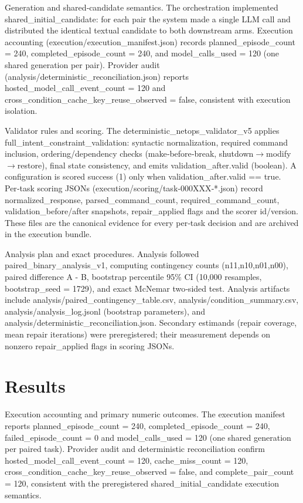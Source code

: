 \documentclass[conference]{IEEEtran}
\begin{document}
Generation and shared‑candidate semantics. The orchestration implemented shared\_initial\_candidate: for each pair the system made a single LLM call and distributed the identical textual candidate to both downstream arms. Execution accounting (execution/execution\_manifest.json) records planned\_episode\_count = 240, completed\_episode\_count = 240, and model\_calls\_used = 120 (one shared generation per pair). Provider audit (analysis/deterministic\_reconciliation.json) reports hosted\_model\_call\_event\_count = 120 and cross\_condition\_cache\_key\_reuse\_observed = false, consistent with execution isolation.

Validator rules and scoring. The deterministic\_netops\_validator\_v5 applies full\_intent\_constraint\_validation: syntactic normalization, required command inclusion, ordering/dependency checks (make‑before‑break, shutdown\ensuremath{\rightarrow}modify\ensuremath{\rightarrow}restore), final state consistency, and emits validation\_after.valid (boolean). A configuration is scored success (1) only when validation\_after.valid == true. Per‑task scoring JSONs (execution/scoring/task‑000XXX‑*.json) record normalized\_response, parsed\_command\_count, required\_command\_count, validation\_before/after snapshots, repair\_applied flags and the scorer id/version. These files are the canonical evidence for every per‑task decision and are archived in the execution bundle.

Analysis plan and exact procedures. Analysis followed paired\_binary\_analysis\_v1, computing contingency counts (n11,n10,n01,n00), paired difference A - B, bootstrap percentile 95\% CI (10,000 resamples, bootstrap\_seed = 1729), and exact McNemar two‑sided test. Analysis artifacts include analysis/paired\_contingency\_table.csv, analysis/condition\_summary.csv, analysis/analysis\_log.jsonl (bootstrap parameters), and analysis/deterministic\_reconciliation.json. Secondary estimands (repair coverage, mean repair iterations) were preregistered; their measurement depends on nonzero repair\_applied flags in scoring JSONs.

\section{Results}
Execution accounting and primary numeric outcomes. The execution manifest reports planned\_episode\_count = 240, completed\_episode\_count = 240, failed\_episode\_count = 0 and model\_calls\_used = 120 (one shared generation per paired task). Provider audit and deterministic reconciliation confirm hosted\_model\_call\_event\_count = 120, cache\_miss\_count = 120, cross\_condition\_cache\_key\_reuse\_observed = false, and complete\_pair\_count = 120, consistent with the preregistered shared\_initial\_candidate execution semantics.
\end{document}
